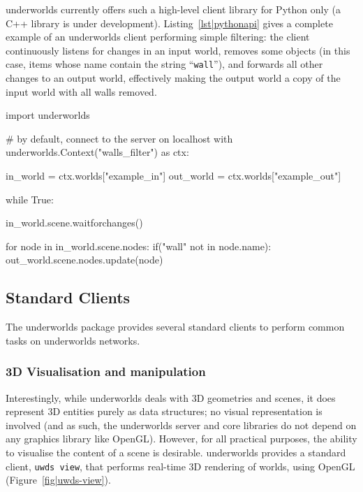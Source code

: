 \documentclass[conference]{IEEEtran}
\newcommand{\uwds}{{\sc underworlds}\xspace}
\begin{document}
\uwds currently offers such a high-level client library for Python only (a C++
library is under development).  Listing~\ref{lst|pythonapi} gives a complete
example of an \uwds client performing simple filtering: the client continuously
listens for changes in an input world, removes some objects (in this case, items
whose name contain the string ``{\tt wall}''), and forwards all other changes to
an output world, effectively making the output world a copy of the input world
with all walls removed.

\begin{listing}[h!]

\begin{pythoncode}
import underworlds

# by default, connect to the server on localhost
with underworlds.Context("walls_filter") as ctx:

    in_world = ctx.worlds["example_in"]
    out_world = ctx.worlds["example_out"]

    while True:

        in_world.scene.waitforchanges()

        for node in in_world.scene.nodes:
            if("wall" not in node.name):
                out_world.scene.nodes.update(node)


\end{pythoncode}
    \caption{Example of a simple yet complete \uwds filter, written in Python:
    the client connects to the \uwds network, walks through the scene graph of
    world {\tt example\_in}, filters out some objects, and publishes the
    remaining objects in the world {\tt example\_out}.}

    \label{lst|pythonapi}
\end{listing}

\subsection{Standard Clients}
\label{std_clients}

The \uwds package provides several standard clients to perform common tasks on
\uwds networks.

\subsubsection{3D Visualisation and manipulation}

Interestingly, while \uwds deals with 3D geometries and scenes, it does
represent 3D entities purely as data structures; no visual representation is
involved (and as such, the \uwds server and core libraries do not depend on any
graphics library like OpenGL). However, for all practical purposes, the ability
to visualise the content of a scene is desirable. \uwds provides a standard
client, {\tt uwds view}, that performs real-time 3D rendering of worlds,
using OpenGL (Figure~\ref{fig|uwds-view}).
\end{document}
